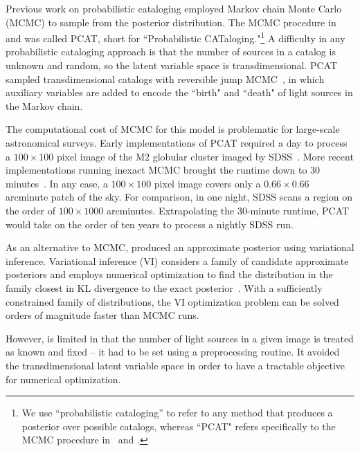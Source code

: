 Previous work on probabilistic cataloging employed Markov chain Monte Carlo (MCMC) to sample from the posterior distribution.
The MCMC procedure in~\cite{Portillo_2017} and \cite{Feder_2019}
was called PCAT, short for ``Probabilistic CATaloging."\footnote{
We use ``probabilistic cataloging'' to refer to any method that produces a posterior over possible catalogs, whereas ``PCAT" refers specifically to the MCMC procedure in~\cite{Portillo_2017} and \cite{Feder_2019}. }
A difficulty in any probabilistic cataloging approach is that the number of sources in a catalog is unknown and random, so the latent variable space is transdimensional. PCAT sampled transdimensional catalogs with reversible jump MCMC~\citep{Green95reversiblejump}, in which
auxiliary variables are added to encode the ``birth" and ``death" of light sources in the Markov chain.

The computational cost of MCMC for this model is problematic for large-scale astronomical surveys. 
Early implementations of PCAT required a day to process a $100\times 100$ pixel image of the M2 globular cluster imaged by SDSS~\citep{Portillo_2017}. 
More recent implementations running inexact MCMC brought the runtime down to 30  minutes~\citep{Feder_2019}.  
In any case, a $100\times 100$ pixel image covers only a $0.66 \times 0.66$ arcminute patch of the sky.
For comparison, in one night, SDSS scans a region on the order of $100 \times 1000$ arcminutes. 
Extrapolating the 30-minute runtime, PCAT would take on the order of ten years to process a nightly SDSS run. 

As an alternative to MCMC, \cite{regier2019_celeste} produced an approximate posterior using variational inference.
Variational inference (VI) considers a family of candidate approximate posteriors and employs numerical optimization to find the distribution in the family closest
in KL divergence to the exact posterior~\citep{Jordan_intro_vi, Wainwrite_graph_models_vi, Blei_2017_vi_review}. 
With a sufficiently constrained family of distributions, the VI optimization problem can be solved orders of magnitude faster than MCMC runs. 

However, \cite{regier2019_celeste} is limited in that the number of light sources in a given image is treated as known and fixed -- it had to be set using a preprocessing routine.
It avoided the transdimensional latent variable space in order to have a tractable objective for numerical optimization. 

\bigbreak


